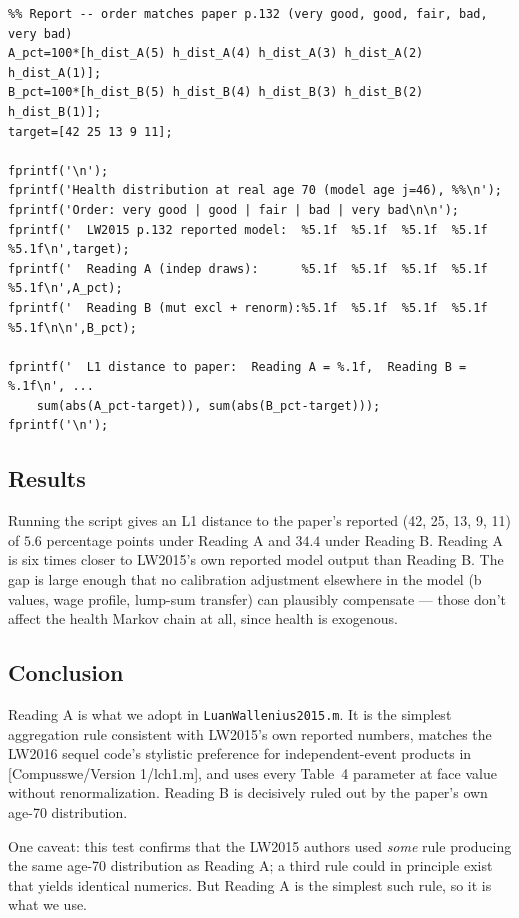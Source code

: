 \begin{small}
\begin{verbatim}
%% Report -- order matches paper p.132 (very good, good, fair, bad, very bad)
A_pct=100*[h_dist_A(5) h_dist_A(4) h_dist_A(3) h_dist_A(2) h_dist_A(1)];
B_pct=100*[h_dist_B(5) h_dist_B(4) h_dist_B(3) h_dist_B(2) h_dist_B(1)];
target=[42 25 13 9 11];

fprintf('\n');
fprintf('Health distribution at real age 70 (model age j=46), %%\n');
fprintf('Order: very good | good | fair | bad | very bad\n\n');
fprintf('  LW2015 p.132 reported model:  %5.1f  %5.1f  %5.1f  %5.1f  %5.1f\n',target);
fprintf('  Reading A (indep draws):      %5.1f  %5.1f  %5.1f  %5.1f  %5.1f\n',A_pct);
fprintf('  Reading B (mut excl + renorm):%5.1f  %5.1f  %5.1f  %5.1f  %5.1f\n\n',B_pct);

fprintf('  L1 distance to paper:  Reading A = %.1f,  Reading B = %.1f\n', ...
    sum(abs(A_pct-target)), sum(abs(B_pct-target)));
fprintf('\n');
\end{verbatim}
\end{small}

\subsection*{Results}

Running the script gives an L1 distance to the paper's reported (42, 25, 13, 9, 11) of $\mathbf{5.6}$ percentage points under Reading A and $\mathbf{34.4}$ under Reading B. Reading A is six times closer to LW2015's own reported model output than Reading B. The gap is large enough that no calibration adjustment elsewhere in the model (b values, wage profile, lump-sum transfer) can plausibly compensate --- those don't affect the health Markov chain at all, since health is exogenous.

\subsection*{Conclusion}

Reading A is what we adopt in \verb|LuanWallenius2015.m|. It is the simplest aggregation rule consistent with LW2015's own reported numbers, matches the LW2016 sequel code's stylistic preference for independent-event products in [Compusswe/Version 1/lch1.m], and uses every Table~4 parameter at face value without renormalization. Reading B is decisively ruled out by the paper's own age-70 distribution.

One caveat: this test confirms that the LW2015 authors used \emph{some} rule producing the same age-70 distribution as Reading A; a third rule could in principle exist that yields identical numerics. But Reading A is the simplest such rule, so it is what we use.
